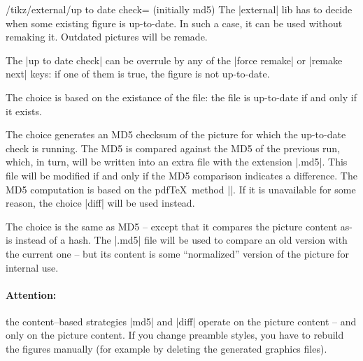 {

\begin{key}{/tikz/external/up to date check= (initially md5)}
	The |external| lib has to decide when some existing figure is up-to-date. In such a case, it can be used without remaking it. Outdated pictures will be remade.

	The |up to date check| can be overrule by any of the |force remake| or |remake next| keys: if one of them is true, the figure is not up-to-date. 

	The choice  is based on the existance of the file: the file is up-to-date if and only if it exists.
	
	The choice  generates an MD5 checksum of the picture for which the up-to-date check is running. The MD5 is compared against the MD5 of the previous run, which, in turn, will be written into an extra file with the extension |.md5|. This file will be modified if and only if the MD5 comparison indicates a difference. The MD5 computation is based on the pdf\TeX\ method |\pdfmdfivesum|. If it is unavailable for some reason, the choice |diff| will be used instead.

	The choice  is the same as MD5 -- except that it compares the picture content as-is instead of a hash. The |.md5| file will be used to compare an old version with the current one -- but its content is some ``normalized'' version of the picture for internal use.

	\paragraph{Attention:} the content--based strategies |md5| and |diff| operate on the picture content -- and only on the picture content. If you change preamble styles, you have to rebuild the figures manually (for example by deleting the generated graphics files).



\end{key}}
